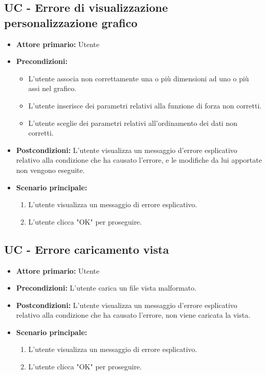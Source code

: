 \subsection{UC - Errore di visualizzazione personalizzazione grafico}
\label{sec:UC - Errore di personalizzazione}
\begin{itemize}
    \item \textbf{Attore primario:} Utente
    \item \textbf{Precondizioni:}
    		\begin{itemize}
    			\item L'utente associa non correttamente una o più dimensioni ad uno o più assi nel grafico.
    			\item L'utente inserisce dei parametri relativi alla funzione di forza non corretti.
    			\item L'utente sceglie dei parametri relativi all'ordinamento dei dati non corretti.
    		\end{itemize}
    \item \textbf{Postcondizioni:} L'utente visualizza un messaggio d'errore esplicativo relativo alla condizione che ha causato l'errore, e le modifiche da lui apportate non vengono eseguite.
    \item \textbf{Scenario principale:}
    \begin{enumerate}
        \item L'utente visualizza un messaggio di errore esplicativo.
        \item L'utente clicca "OK" per proseguire.
    \end{enumerate}
\end{itemize}

\subsection{UC - Errore caricamento vista}
\label{sec:UC - Errore caricamento vista}
\begin{itemize}
    \item \textbf{Attore primario:} Utente
    \item \textbf{Precondizioni:} L'utente carica un file vista malformato.
    \item \textbf{Postcondizioni:} L'utente visualizza un messaggio d'errore esplicativo relativo alla condizione che ha causato l'errore, non viene caricata la vista.
    \item \textbf{Scenario principale:}
    \begin{enumerate}
        \item L'utente visualizza un messaggio di errore esplicativo.
        \item L'utente clicca "OK" per proseguire.
    \end{enumerate}
\end{itemize}

